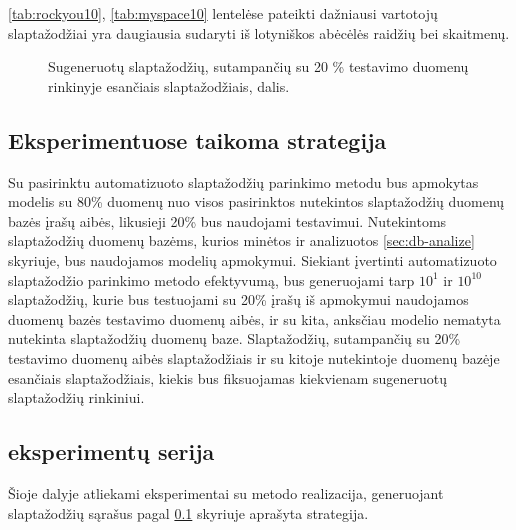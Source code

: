 \documentclass{VUMIFInfBakalaurinis}
\begin{document}
\ref{tab:rockyou10}, \ref{tab:myspace10} lentelėse pateikti dažniausi vartotojų 
slaptažodžiai yra daugiausia sudaryti iš lotyniškos abėcėlės raidžių bei 
skaitmenų.

\begin{figure}[!ht]
  \begin{center}
  \end{center}
  \caption{
    Sugeneruotų slaptažodžių, sutampančių su 20 \% testavimo duomenų rinkinyje 
    esančiais slaptažodžiais, dalis.
  }
  \label{plot:kazkoks}
\end{figure}

\subsection{Eksperimentuose taikoma strategija} \label{sec:strategy}
Su pasirinktu automatizuoto slaptažodžių parinkimo metodu bus apmokytas modelis 
su 80\% duomenų nuo visos pasirinktos nutekintos slaptažodžių duomenų bazės 
įrašų aibės, likusieji 20\% bus naudojami testavimui. Nutekintoms slaptažodžių 
duomenų bazėms, kurios minėtos ir analizuotos \ref{sec:db-analize} skyriuje, bus 
naudojamos modelių apmokymui. Siekiant įvertinti automatizuoto slaptažodžio 
parinkimo metodo efektyvumą, bus generuojami tarp $10^{1}$ ir $10^{10}$ 
slaptažodžių, kurie bus testuojami su 20\% įrašų iš apmokymui naudojamos duomenų 
bazės testavimo duomenų aibės, ir su kita, anksčiau modelio nematyta nutekinta 
slaptažodžių duomenų baze. Slaptažodžių, sutampančių su 20\% testavimo duomenų 
aibės slaptažodžiais ir su kitoje nutekintoje duomenų bazėje esančiais 
slaptažodžiais, kiekis bus fiksuojamas kiekvienam sugeneruotų slaptažodžių 
rinkiniui.

\subsection{ eksperimentų serija}
Šioje dalyje atliekami eksperimentai su  metodo 
realizacija\footnotemark, generuojant slaptažodžių sąrašus pagal 
\ref{sec:strategy} skyriuje aprašyta strategija.
\end{document}
